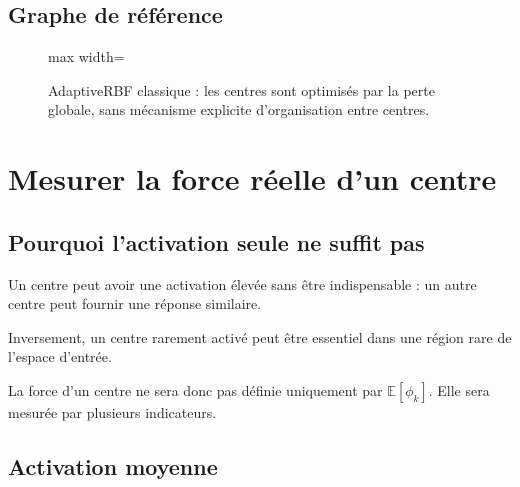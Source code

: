 \documentclass[11pt,a4paper]{article}
\begin{document}
\subsection{Graphe de référence}

\begin{figure}[H]
\centering
\begin{adjustbox}{max width=\linewidth}
\end{adjustbox}
\caption{AdaptiveRBF classique : les centres sont optimisés par la perte
globale, sans mécanisme explicite d'organisation entre centres.}
\end{figure}

\section{Mesurer la force réelle d'un centre}

\subsection{Pourquoi l'activation seule ne suffit pas}

Un centre peut avoir une activation élevée sans être indispensable :
un autre centre peut fournir une réponse similaire.

Inversement, un centre rarement activé peut être essentiel dans une
région rare de l'espace d'entrée.

La force d'un centre ne sera donc pas définie uniquement par
\(\mathbb{E}[\phi_k]\). Elle sera mesurée par plusieurs indicateurs.

\subsection{Activation moyenne}
\end{document}
